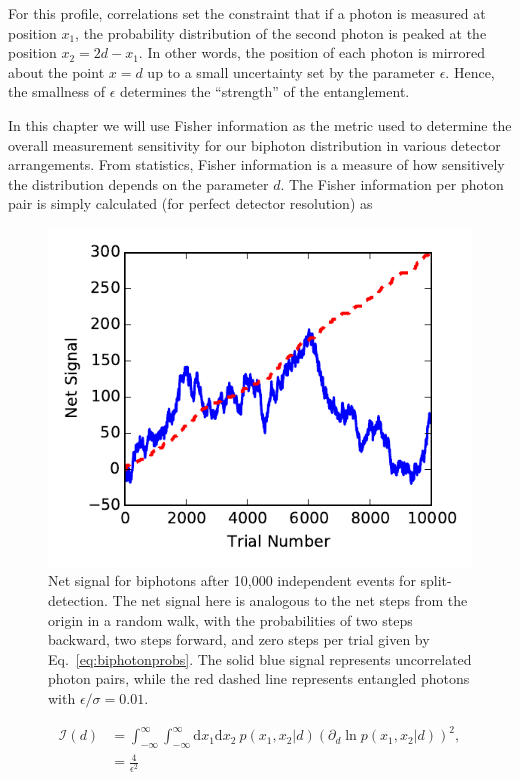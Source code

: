 For this profile, correlations set the constraint that if a photon is measured at position $x_1$, the probability distribution of the second photon is peaked at the position $x_2 = 2d - x_1$.  
In other words, the position of each photon is mirrored about the point $x = d$ up to a small uncertainty set by the parameter $\epsilon$. 
Hence, the smallness of $\epsilon$ determines the ``strength'' of the entanglement. 

In this chapter we will use Fisher information \cite{Larsen2001} as the metric used to determine the overall measurement sensitivity for our biphoton distribution in various detector arrangements.  
From statistics, Fisher information is a measure of how sensitively the distribution depends on the parameter $d$.
The Fisher information per photon pair is simply calculated (for perfect detector resolution) as 
\begin{figure}
	\centerline{\includegraphics[scale=1]{Biphotons/Figures/random-walk.pdf}}
	\caption{Net signal for biphotons after 10,000 independent events for split-detection.  
		The net signal here is analogous to the net steps from the origin in a random walk, with the probabilities of two steps backward, two steps forward, and zero steps per trial given by Eq.~\eqref{eq:biphotonprobs}.  
		The solid blue signal represents uncorrelated photon pairs, while the red dashed line represents entangled photons with $\epsilon/\sigma = 0.01$.}
	\label{fig:random walk}
\end{figure}
\begin{align}\label{eq:biphotonFisher}
	\nonumber	\mathcal{I}(d) &= \int^\infty_{-\infty}\int^\infty_{-\infty} \text{d}x_1 \text{d}x_2~ p({x_1,x_2}|d)\left( \partial_d \ln  p({x_1,x_2}|d)\right)^2, \\
	&= \frac{4}{\epsilon^2}
\end{align}
